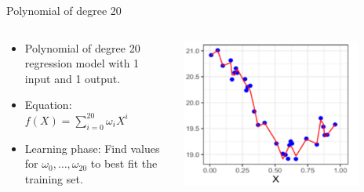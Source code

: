 \begin{frame}{Polynomial of degree 20}
  \begin{columns}
    \begin{column}{0.5\textwidth}
  \begin{itemize}
    \item Polynomial of degree 20 regression model with 1 input and 1 output.
    \item Equation: $f(X) = \sum_{i=0}^{20} \omega_i X^i$
    \item Learning phase: Find values for $\omega_0, \dots, \omega_{20}$ to best fit the training set.
  \end{itemize}
\end{column}
\begin{column}{0.5\textwidth}
  \includegraphics[width=0.8\textwidth]{images/pm20.png}
\end{column}
\end{columns}
\end{frame}

